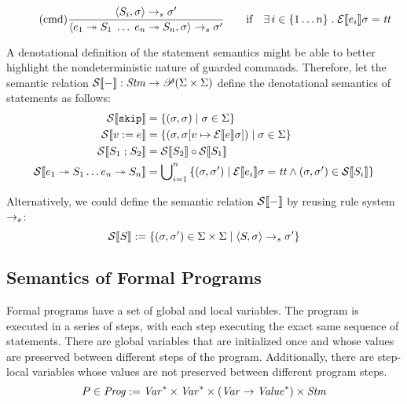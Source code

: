 \documentclass{article}
\begin{document}
\begin{equation*}
	\tag{cmd}
	\dfrac
	{
		\langle S_i, \sigma \rangle
			\rightarrow_s
		\sigma'
	}
	{
		\langle e_1 \; \mathtt{\twoheadrightarrow} \; S_1 \; \ldots \; e_n \; \mathtt{\twoheadrightarrow} \; S_n, \sigma \rangle
			\rightarrow_s
		\sigma'
	}
	\qquad \text{if} \quad \exists \, i \in \{1 \ldots n\} \; . \; \mathcal{E} \llbracket e_i \rrbracket \sigma = \mathit{tt}
\end{equation*}

A denotational definition of the statement semantics might be able to better highlight the nondeterministic nature of guarded
commands. Therefore, let the semantic relation $\mathcal{S} \llbracket - \rrbracket : \mathit{Stm} \rightarrow \mathscr{P}(\Sigma \times \Sigma)$ define the
denotational semantics of statements as follows:
\begin{align*}
	\mathcal{S} \llbracket \mathtt{skip} \rrbracket &= \{ (\sigma, \sigma) \mid \sigma \in \Sigma \}
	\\
	\mathcal{S} \llbracket v\; \mathtt{:=}\; e \rrbracket &= \{ (\sigma, \sigma[v \mapsto \mathcal{E} \llbracket e \rrbracket \sigma]) \mid \sigma \in \Sigma \}
	\\
	\mathcal{S} \llbracket S_1 \; \mathtt{;} \; S_2 \rrbracket &= \mathcal{S} \llbracket S_2 \rrbracket \circ \mathcal{S} \llbracket S_1 \rrbracket
	\\
	\mathcal{S} \llbracket e_1 \; \mathtt{\twoheadrightarrow} \; S_1 \ldots e_n \; \mathtt{\twoheadrightarrow} \; S_n \rrbracket &= 
		\bigcup\nolimits_{i = 1}^n 
		{\{ (\sigma, \sigma') \mid \mathcal{E} \llbracket e_i \rrbracket \sigma = \mathit{tt} \wedge (\sigma, \sigma') \in \mathcal{S} \llbracket S_i \rrbracket \}}
\end{align*}

Alternatively, we could define the semantic relation $\mathcal{S} \llbracket - \rrbracket$ by reusing rule system $\rightarrow_s$:
\begin{equation*}
	\mathcal{S} \llbracket S \rrbracket := \{ (\sigma, \sigma') \in \Sigma \times \Sigma \mid \langle S, \sigma \rangle \rightarrow_s \sigma' \}
\end{equation*}

\subsection{Semantics of Formal Programs}

Formal programs have a set of global and local variables. The program is executed in a series of steps, with each step executing
the exact same sequence of statements. There are global variables that are initialized once and whose values are preserved between
different steps of the program. Additionally, there are step-local variables whose values are not preserved between different
program steps.
\begin{equation*}
	P \in \mathit{Prog} := \mathit{Var}^* \times \mathit{Var}^* \times (\mathit{Var} \rightarrow \mathit{Value}^*) \times \mathit{Stm}
\end{equation*}
\end{document}
